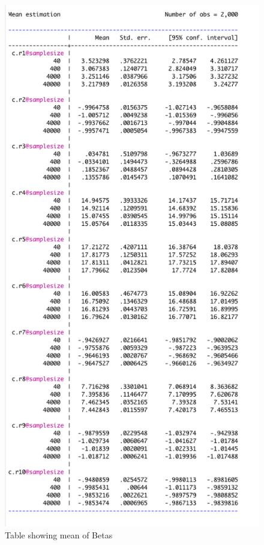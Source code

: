\documentclass[
]{article}
\begin{document}
\begin{figure}
\centering
\includegraphics{img/table2.png}
\caption{Table showing mean of Betas}
\end{figure}
\end{document}
